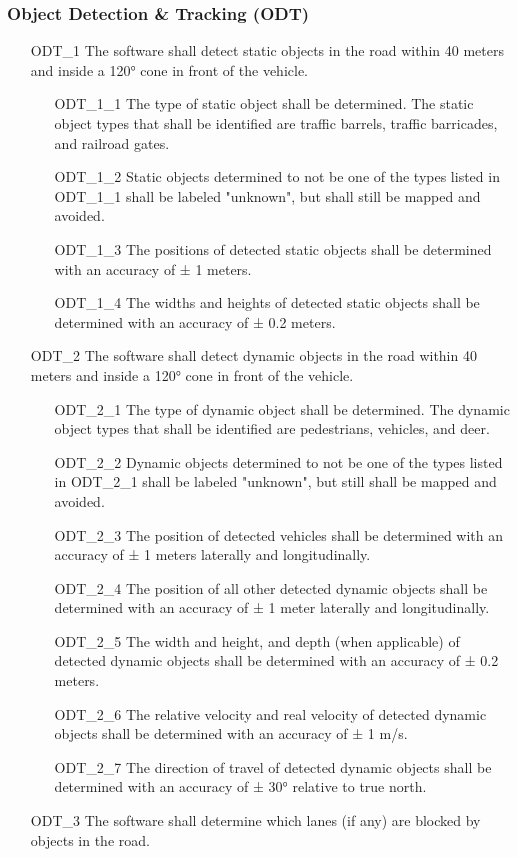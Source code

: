 \subsubsection{Object Detection \& Tracking (ODT)}
\begin{itemize}
    \item[ODT\_1] The software shall detect static objects in the road within 40 meters and inside a 120° cone in front of the vehicle.
    \begin{itemize}
        \item[ODT\_1\_1] The type of static object shall be determined. The static object types that shall be identified are traffic barrels, traffic barricades, and railroad gates.
        \item[ODT\_1\_2] Static objects determined to not be one of the types listed in ODT\_1\_1 shall be labeled "unknown", but shall still be mapped and avoided.
        \item[ODT\_1\_3] The positions of detected static objects shall be determined with an accuracy of ± 1 meters.
        \item[ODT\_1\_4] The widths and heights of detected static objects shall be determined with an accuracy of ± 0.2 meters.
    \end{itemize}
    \item[ODT\_2] The software shall detect dynamic objects in the road within 40 meters and inside a 120° cone in front of the vehicle.
    \begin{itemize}
        \item[ODT\_2\_1] The type of dynamic object shall be determined. The dynamic object types that shall be identified are pedestrians, vehicles, and deer.
        \item[ODT\_2\_2] Dynamic objects determined to not be one of the types listed in ODT\_2\_1 shall be labeled "unknown", but still shall be mapped and avoided.
        \item[ODT\_2\_3] The position of detected vehicles shall be determined with an accuracy of ± 1 meters laterally and longitudinally.
        \item[ODT\_2\_4] The position of all other detected dynamic objects shall be determined with an accuracy of ± 1 meter laterally and longitudinally.
        \item[ODT\_2\_5] The width and height, and depth (when applicable) of detected dynamic objects shall be determined with an accuracy of ± 0.2 meters.
        \item[ODT\_2\_6] The relative velocity and real velocity of detected dynamic objects shall be determined with an accuracy of ± 1 m/s.
        \item[ODT\_2\_7] The direction of travel of detected dynamic objects shall be determined with an accuracy of ± 30° relative to true north.
    \end{itemize}
    \item[ODT\_3] The software shall determine which lanes (if any) are blocked by objects in the road.
\end{itemize}